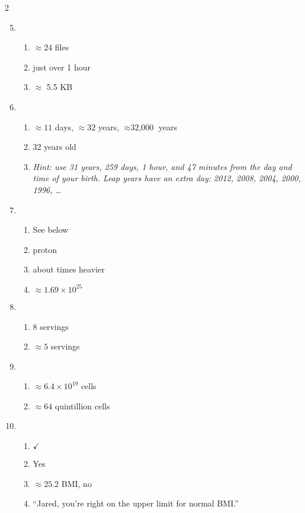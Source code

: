 \begin{multicols} {2}
\begin{enumerate}
\setcounter{enumi}{4}

\item %
\begin{enumerate}
\item $\approx 24$ files
\item just over 1 hour
\item $\approx$ 5.5 KB
\end{enumerate}

\item %
\begin{enumerate}
\item $\approx 11$ days, $\approx 32$ years, $\approx \text{32,000}$ years 
\item 32 years old
\item \emph{Hint: use 31 years, 259 days, 1 hour, and 47 minutes from the day and time of your birth.  Leap years have an extra day:  2012, 2008, 2004, 2000, 1996, \ldots}
\end{enumerate}

\item %
\begin{enumerate}
\item See below
\item proton
\item about  times heavier
\item $\approx 1.69 \times 10^{25}$
\end{enumerate}

\item %
\begin{enumerate}
\item 8 servings
\item $\approx 5$ servings
\end{enumerate}

\item %
\begin{enumerate}
\item $\approx 6.4 \times 10^{19}$ cells
\item $\approx 64$ quintillion cells
\end{enumerate}

\item %
\begin{enumerate}
\item $\checkmark$
\item Yes
\item $\approx 25.2$ BMI, no
\item ``Jared, you're right on the upper limit for normal BMI.''
\end{enumerate}

\end{enumerate}
\end{multicols}

